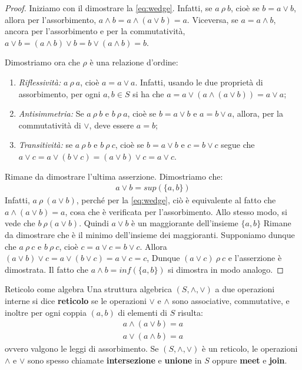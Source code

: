 \begin{proof}
	Iniziamo con il dimostrare la \ref{eq:wedge}. Infatti, se $a \ \rho \ b$, cioè se $b = a \vee b$, allora per l'assorbimento, $a \wedge b = a \wedge (a \vee b) = a$. Viceversa, se $a = a \wedge b$, ancora per l'assorbimento e per la commutatività, $a \vee b = (a \wedge b) \vee b = b \vee (a \wedge b) = b$.
	
	Dimostriamo ora che $\rho$ è una relazione d'ordine:
	\begin{enumerate}
		\item \textit{Riflessività:} $a \ \rho \ a$, cioè $a = a \vee a$. Infatti, usando le due proprietà di assorbimento, per ogni $a,b \in S$ si ha che $a = a \vee (a \wedge (a \vee b)) = a \vee a$;
		\item \textit{Antisimmetria:} Se $a \ \rho \ b$ e $b \ \rho \ a$, cioè se $b = a \vee b$ e $a = b \vee a $, allora, per la commutatività di $\vee$, deve essere $a=b$;
		\item \textit{Transitività:} se $a \ \rho \ b$ e $b \ \rho \ c$, cioè se $b= a \vee b$ e $c = b \vee c$ segue che $a \vee c = a \vee (b \vee c ) = (a \vee b) \vee c = a \vee c$.
	\end{enumerate}
	
	Rimane da dimostrare l'ultima asserzione. Dimostriamo che:
	\begin{align*}
		a \vee b = sup(\{a,b\})
	\end{align*}
Infatti, $a \ \rho \ (a \vee b)$, perché per la \ref{eq:wedge}, ciò è equivalente al fatto che $a \wedge ( a \vee b) = a$, cosa che è verificata per l'assorbimento. Allo stesso modo, si vede che $b \ \rho (a \vee b)$. Quindi $a \vee b$ è un maggiorante dell'insieme $\{a,b\}$ Rimane da dimostrare che è il minimo dell'insieme dei maggioranti. Supponiamo dunque che $a \ \rho \ c$ e $b \ \rho \ c$, cioè $c = a \vee c = b \vee c$. Allora $(a \vee b) \vee c = a \vee ( b \vee c) = a \vee c = c$, Dunque $(a \vee c) \ \rho \ c$ e l'asserzione è dimostrata. Il fatto che $ a \wedge b = inf(\{a,b\})$ si dimostra in modo analogo.
\end{proof}
\begin{defbox}{Reticolo come algebra}
Una struttura algebrica $(S,\wedge, \vee)$ a due operazioni interne si dice \textbf{reticolo} se le operazioni $\vee$ e $\wedge$ sono associative, commutative, e inoltre per ogni coppia $(a,b)$ di elementi di $S$ risulta:
\begin{eqnarray}\label{eq:assorbimento_meet_join}
	a \wedge(a \vee b) = a\\
	a \vee (a \wedge b)  = a
\end{eqnarray}
ovvero valgono le leggi di assorbimento. Se $(S,\wedge, \vee)$ è un reticolo, le operazioni $\wedge$ e $\vee$ sono spesso chiamate \textbf{intersezione} e \textbf{unione} in $S$ oppure \textbf{meet} e \textbf{join}.
\end{defbox}

